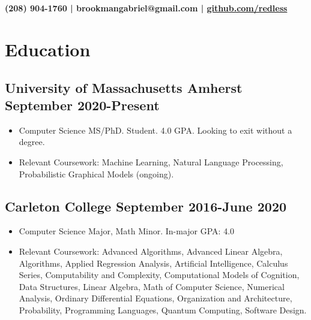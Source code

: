 \documentclass[12pt]{article}
\begin{document}
{\selectfont

\section*{}
\begin{center}\textbf{(208) 904-1760 | brookmangabriel@gmail.com | \href{https://github.com/redless}{github.com/redless}}\end{center}
\section*{Education}

\subsection*{University of Massachusetts Amherst \hfill September 2020-Present} 
  \begin{itemize}

  \item Computer Science MS/PhD. Student. 4.0 GPA. Looking to exit without a degree.
\item
  Relevant Coursework: Machine Learning, Natural Language Processing, Probabilistic Graphical Models (ongoing).

\end{itemize}

  \subsection*{Carleton College \hfill September 2016-June 2020} 
  \begin{itemize}

  \item Computer Science Major, Math Minor. In-major GPA: 4.0
\item
  Relevant Coursework: Advanced Algorithms, Advanced Linear Algebra, Algorithms, Applied Regression Analysis, Artificial Intelligence, Calculus Series, Computability and Complexity, Computational Models of Cognition, Data Structures, Linear Algebra, Math of Computer Science, Numerical Analysis, Ordinary Differential Equations, Organization and
  Architecture, Probability, Programming Languages, Quantum Computing, Software Design.
  


\end{itemize}}
\end{document}
